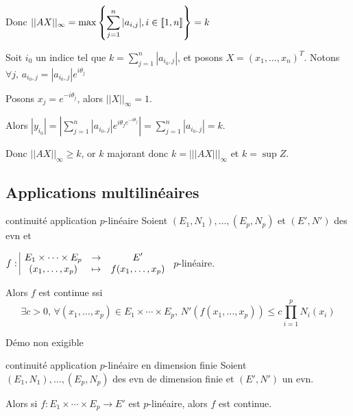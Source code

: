 Donc $\displaystyle ||AX||_\infty = \max \left\{ \sum_{j = 1 }^{n } |a_{i, j}|, i \in [\![1, n]\!]  \right\} = k$

Soit $i_0$ un indice tel que $k = \sum_{j=1}^n |a_{i_0, j}|$, et posons 
$X = (x_1, \ldots, x_n)^T$. Notons $\forall j, \, a_{i_0, j} = |a_{i_0, j}| e^{i \theta_j}$ 

Posons $x_j = e^{-i \theta_j}$, alors $||X||_\infty = 1$.

Alors $|y_{i_0}| = \left|\sum_{j = 1 }^{n } | a_{i_0, j} | e^{i \theta_j e^{-i \theta_j}}\right| = \sum_{j=1}^n |a_{i_0, j}| = k$.

Donc $|| AX||_\infty \geqslant k$, or $k$ majorant donc $k = |||AX |||_\infty$ et $k = \sup Z$. 


\subsection{Applications multilinéaires }

\begin{theoreme}{continuité application $p$-linéaire}{}
    Soient $(E_1, N_1), \ldots, (E_p, N_p)$ et $(E', N')$ des evn et 
    
    $f: \space \begin{array}{|ccc} \displaystyle E_1 \times \cdots \times E_p & \to & \displaystyle E' \\ \displaystyle (x_1, \ldots, x_p) & \mapsto & \displaystyle f(x_1, \ldots, x_p) \end{array}$ 
    $p$-linéaire. 

    Alors $f$ est continue ssi $$\exists c > 0, \, \forall (x_1, \ldots, x_p) \in E_1 \times \cdots \times E_p, \, N'(f(x_1, \ldots, x_p)) \leqslant c \prod_{i=1}^p N_i(x_i)$$
\end{theoreme}


Démo non exigible 


\begin{proposition}{continuité application $p$-linéaire en dimension finie}{}
    Soient $(E_1, N_1), \ldots, (E_p, N_p)$ des evn de dimension finie et $(E', N')$ un evn.

    Alors si $f : E_1 \times \cdots \times E_p \to E'$ est $p$-linéaire, alors $f$ est continue.
\end{proposition}

